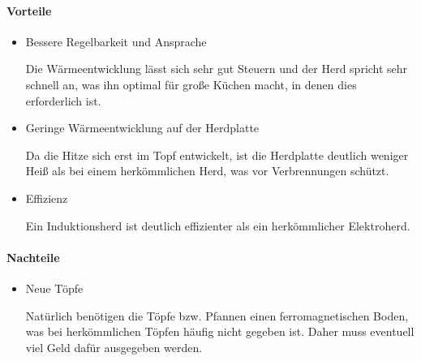 \paragraph{Vorteile}

\begin{itemize}
	\item Bessere Regelbarkeit und Ansprache
	
Die Wärmeentwicklung lässt sich sehr gut Steuern und der Herd spricht sehr schnell an, was ihn optimal für große Küchen macht, in denen dies erforderlich ist.

	\item Geringe Wärmeentwicklung auf der Herdplatte
	
Da die Hitze sich erst im Topf entwickelt, ist die Herdplatte deutlich weniger Heiß als bei einem herkömmlichen Herd, was vor Verbrennungen schützt.

	\item Effizienz
	
Ein Induktionsherd ist deutlich effizienter als ein herkömmlicher Elektroherd.
\end{itemize}



\paragraph{Nachteile}

\begin{itemize}

	\item Neue Töpfe

Natürlich benötigen die Töpfe bzw. Pfannen einen ferromagnetischen Boden, was bei herkömmlichen Töpfen häufig nicht gegeben ist. Daher muss eventuell viel Geld dafür ausgegeben werden.
\end{itemize}

